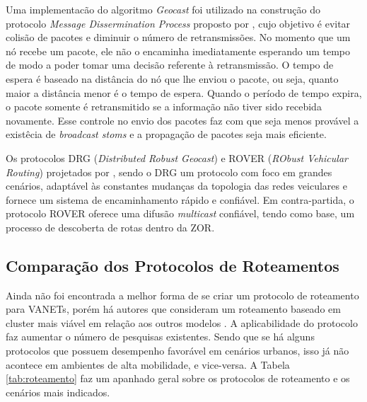 \documentclass[
	12pt,				%
	oneside,			%
	a4paper,			%
	english,			%
	brazil				%
	]{abntex2ppgsi}
\begin{document}
Uma implementacão do algoritmo \textit{Geocast} foi utilizado na construção do protocolo \textit{Message Dissermination Process} proposto por  , cujo objetivo é evitar colisão de pacotes e diminuir o número de retransmissões. No momento que um nó recebe um pacote, ele não o encaminha imediatamente esperando um tempo de  modo a poder tomar uma decisão referente à retransmissão. O tempo de espera é baseado na distância do nó que lhe enviou o pacote, ou seja, quanto maior a distância menor é o tempo de espera. Quando o período de tempo expira, o pacote somente é retransmitido se a informação não tiver sido recebida novamente. Esse controle no envio dos pacotes  faz com que seja menos provável a existêcia de \textit{broadcast stoms} e a propagação de pacotes seja mais eficiente.

Os protocolos DRG (\textit{Distributed Robust Geocast}) e ROVER (\textit{RObust Vehicular Routing}) projetados por , sendo o DRG um protocolo com foco em grandes cenários, adaptável às constantes mudanças da topologia das redes veiculares e fornece um sistema de encaminhamento rápido e confiável. Em contra-partida, o protocolo ROVER oferece uma difusão \textit{multicast} confiável, tendo como base, um processo de descoberta de rotas dentro da ZOR.

\subsection{Comparação dos Protocolos de Roteamentos}

Ainda não foi encontrada a melhor forma de se criar um protocolo de roteamento para VANETs, porém há autores que consideram um roteamento baseado em cluster mais viável em relação aos outros modelos \cite{luis2009melhoria}. A aplicabilidade do protocolo faz aumentar o número de pesquisas existentes. Sendo que se há alguns protocolos que possuem desempenho favorável em cenários urbanos, isso já não acontece em ambientes de alta mobilidade, e vice-versa. A Tabela \ref{tab:roteamento} faz um apanhado geral sobre os protocolos de roteamento e os cenários mais indicados.
\end{document}
